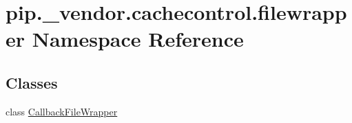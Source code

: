 \hypertarget{namespacepip_1_1__vendor_1_1cachecontrol_1_1filewrapper}{}\section{pip.\+\_\+vendor.\+cachecontrol.\+filewrapper Namespace Reference}
\label{namespacepip_1_1__vendor_1_1cachecontrol_1_1filewrapper}
\subsection*{Classes}
\begin{DoxyCompactItemize}
\item 
class \hyperlink{classpip_1_1__vendor_1_1cachecontrol_1_1filewrapper_1_1CallbackFileWrapper}{Callback\+File\+Wrapper}
\end{DoxyCompactItemize}
